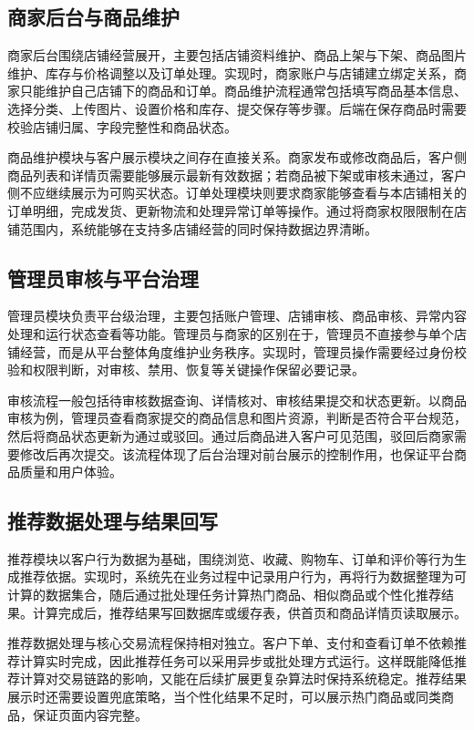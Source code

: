 ﻿\documentclass[oneside, UTF8]{ctexbook}
\begin{document}
\subsection{商家后台与商品维护}

商家后台围绕店铺经营展开，主要包括店铺资料维护、商品上架与下架、商品图片维护、库存与价格调整以及订单处理。实现时，商家账户与店铺建立绑定关系，商家只能维护自己店铺下的商品和订单。商品维护流程通常包括填写商品基本信息、选择分类、上传图片、设置价格和库存、提交保存等步骤。后端在保存商品时需要校验店铺归属、字段完整性和商品状态。

商品维护模块与客户展示模块之间存在直接关系。商家发布或修改商品后，客户侧商品列表和详情页需要能够展示最新有效数据；若商品被下架或审核未通过，客户侧不应继续展示为可购买状态。订单处理模块则要求商家能够查看与本店铺相关的订单明细，完成发货、更新物流和处理异常订单等操作。通过将商家权限限制在店铺范围内，系统能够在支持多店铺经营的同时保持数据边界清晰。

\subsection{管理员审核与平台治理}

管理员模块负责平台级治理，主要包括账户管理、店铺审核、商品审核、异常内容处理和运行状态查看等功能。管理员与商家的区别在于，管理员不直接参与单个店铺经营，而是从平台整体角度维护业务秩序。实现时，管理员操作需要经过身份校验和权限判断，对审核、禁用、恢复等关键操作保留必要记录。

审核流程一般包括待审核数据查询、详情核对、审核结果提交和状态更新。以商品审核为例，管理员查看商家提交的商品信息和图片资源，判断是否符合平台规范，然后将商品状态更新为通过或驳回。通过后商品进入客户可见范围，驳回后商家需要修改后再次提交。该流程体现了后台治理对前台展示的控制作用，也保证平台商品质量和用户体验。

\subsection{推荐数据处理与结果回写}

推荐模块以客户行为数据为基础，围绕浏览、收藏、购物车、订单和评价等行为生成推荐依据。实现时，系统先在业务过程中记录用户行为，再将行为数据整理为可计算的数据集合，随后通过批处理任务计算热门商品、相似商品或个性化推荐结果。计算完成后，推荐结果写回数据库或缓存表，供首页和商品详情页读取展示。

推荐数据处理与核心交易流程保持相对独立。客户下单、支付和查看订单不依赖推荐计算实时完成，因此推荐任务可以采用异步或批处理方式运行。这样既能降低推荐计算对交易链路的影响，又能在后续扩展更复杂算法时保持系统稳定。推荐结果展示时还需要设置兜底策略，当个性化结果不足时，可以展示热门商品或同类商品，保证页面内容完整。
\end{document}
